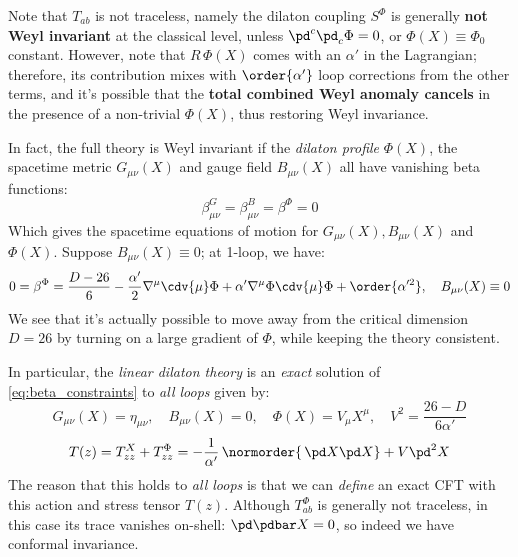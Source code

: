 \documentclass[a4paper
	,10pt
]{article}
\begin{document}
	Note that $T_{ab}$ is not traceless, namely the dilaton coupling $S^\Phi$ is generally \textbf{not Weyl invariant} at the classical level, unless $\pd^c \pd_c \Phi = 0$, or $\Phi(X) \equiv \Phi_0$ constant. 
	However, note that $R\,\Phi(X)$ comes with an $\alpha'$ in the Lagrangian; therefore, its contribution mixes with $\order{\alpha'}$ loop corrections from the other terms, and it's possible that the \textbf{total combined Weyl anomaly cancels} in the presence of a non-trivial $\Phi(X)$, thus restoring Weyl invariance. 
	
	In fact, the full theory is Weyl invariant if the \textit{dilaton profile} $\Phi(X)$, the spacetime metric $G_{\mu\nu}(X)$ and gauge field $B_{\mu\nu}(X)$ all have vanishing beta functions:
	\begin{equation}
		\beta^G_{\mu\nu}
		= \beta^B_{\mu\nu}
		= \beta^\Phi = 0
	\label{eq:beta_constraints}
	\end{equation}
	Which gives the spacetime equations of motion for $G_{\mu\nu}(X), B_{\mu\nu}(X)$ and $\Phi(X)$. 
	Suppose $B_{\mu\nu}(X) \equiv 0$; at 1-loop, we have:
	\begin{equation}
		0 = \beta^\Phi
		= \frac{D - 26}{6}
			- \frac{\alpha'}{2} \nabla^\mu \cdv{\mu} \Phi
			+ \alpha' \nabla^\mu \Phi \cdv{\mu} \Phi
			+ \order{\alpha'^2},
	\quad
		B_{\mu\nu}(X) \equiv 0
	\end{equation}
	We see that it's actually possible to move away from the critical dimension $D = 26$ by turning on a large gradient of $\Phi$, while keeping the theory consistent. 
	
	In particular, the \textit{linear dilaton theory} is an \textit{exact} solution of \eqref{eq:beta_constraints} to \textit{all loops} given by:
	\begin{equation}
		G_{\mu\nu}(X) = \eta_{\mu\nu},
	\quad
		B_{\mu\nu}(X) = 0,
	\quad
		\Phi(X) = V_\mu X^\mu,
	\quad
		V^2 = \frac{26 - D}{6\alpha'}
	\end{equation}
	\vspace{-.5\baselineskip}
	\begin{equation}
		T(z)
		= T^X_{zz} + T^\Phi_{zz}
		= -\frac{1}{\alpha'}\,\normorder{\,\pd X \pd X}
			+ V \pd^2 X
	\end{equation}
	The reason that this holds to \textit{all loops} is that we can \textit{define} an exact CFT with this action and stress tensor $T(z)$. Although $T^\Phi_{ab}$ is generally not traceless, in this case its trace vanishes on-shell: $\pd \pdbar X = 0$, so indeed we have conformal invariance. 
	
\end{document}
